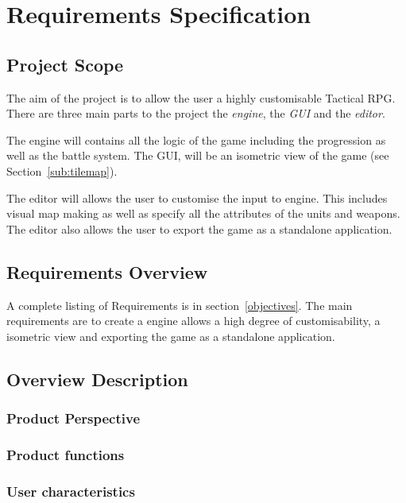 \section{Requirements Specification}

\subsection{Project Scope}
\label{sub:project_scope}

The aim of the project is to allow the user a highly customisable Tactical RPG.  There are three main parts to the project the \emph{engine}, the \emph{GUI} and the \emph{editor}.

The engine will contains all the logic of the game including the progression as well as the battle system. The GUI, will be an isometric view of the game (see Section~\ref{sub:tilemap}). 

The editor will allows the user to customise the input to engine. This includes visual map making as well as specify all the attributes of the units and weapons.  The editor also allows the user to export the game as a standalone application.

\subsection{Requirements Overview}
\label{sub:overview}
A complete listing of Requirements is in section~\ref{objectives}. The main requirements are to create a engine allows a high degree of customisability, a isometric view and exporting the game as  a standalone application.  

\subsection{Overview Description}

\subsubsection{Product Perspective}

\subsubsection{Product functions}

\subsubsection{User characteristics}

